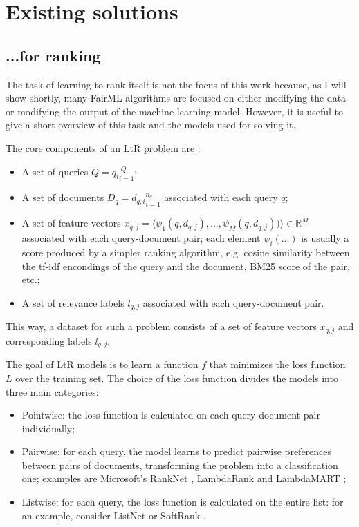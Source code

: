 \section{Existing solutions}\label{sect:int_3}

\subsection{...for ranking}

The task of learning-to-rank itself is not the focus of this work because, as I will show shortly, many FairML algorithms are focused on either modifying the data or modifying the output of the machine learning model. However, it is useful to give a short overview of this task and the models used for solving it. 

The core components of an LtR problem are \cite{Qin2010LETORAB}:
\begin{itemize}
\item A set of queries $Q = {q_i}_{i=1}^{|Q|}$;
\item A set of documents $D_q = {d_{q,i}}_{i=1}^{n_q}$ associated with each query $q$;
\item A set of feature vectors $x_{q,j} = \langle \psi_1 (q, d_{q,j}), ..., \psi_M (q, d_{q,j})) \rangle \in \mathbb{R}^M$ associated with each query-document pair; each element $\psi_i (...)$ is usually a score produced by a simpler ranking algorithm, e.g. cosine similarity between the tf-idf encondings of the query and the document, BM25 score of the pair, etc.;
\item A set of relevance labels $l_{q,j}$ associated with each query-document pair.
\end{itemize}

This way, a dataset for such a problem consists of a set of feature vectors $x_{q,j}$ and corresponding labels $l_{q,j}$.

The goal of LtR models is to learn a function $f$ that minimizes the loss function $L$ over the training set. The choice of the loss function divides the models into three main categories:

\begin{itemize}
\item Pointwise: the loss function is calculated on each query-document pair individually;
\item Pairwise: for each query, the model learns to predict pairwise preferences between pairs of documents, transforming the problem into a classification one;
examples are Microsoft’s RankNet \cite{RankNet}, LambdaRank \cite{LambdaRank} and LambdaMART \cite{LambdaMART};
\item Listwise: for each query, the loss function is calculated on the entire list: for an example, consider ListNet \cite{ListNet} or SoftRank \cite{taylor2008softrank}.
\end{itemize}

